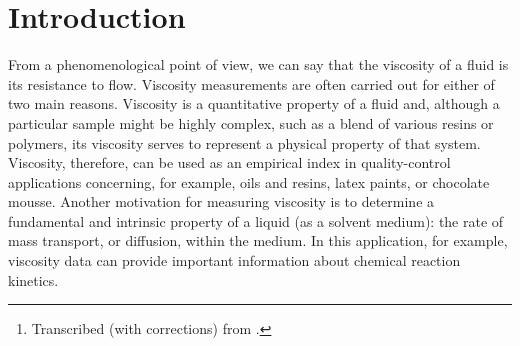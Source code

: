 \maketitle%

\begin{abstract}
\noindent
The objective of this lab is to determine the viscosity-average molecular weight of poly(vinyl alcohol) (PVOH) and the fraction of ``head-to-head'' monomer linkages in the polymer.\thanks{Transcribed (with corrections) from \textcite{halpern97}.} %
\end{abstract}

\section{Introduction} %
\label{sec:intro}

From a phenomenological point of view, we can say that the viscosity of a fluid is its resistance to flow. 
Viscosity measurements are often carried out for either of two main reasons. 
Viscosity is a quantitative property of a fluid and, although a particular sample might be highly complex, such as a blend of various resins or polymers, its viscosity serves to represent a physical property of that system. 
Viscosity, therefore, can be used as an empirical index in quality-control applications concerning, for example, oils and resins, latex paints, or chocolate mousse. 
Another motivation for measuring viscosity is to determine a fundamental and intrinsic property of a liquid (as a solvent medium): the rate of mass transport, or diffusion, within the medium. 
In this application, for example, viscosity data can provide important information about chemical reaction kinetics. 

